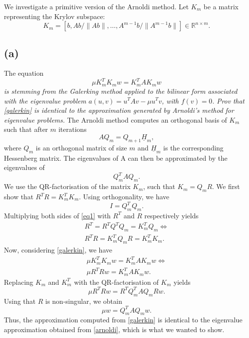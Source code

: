 We investigate a primitive version of the Arnoldi method. Let $K_m$ be a matrix representing the Krylov subspace: 
\begin{equation}
K_m = [b, Ab/ \|Ab\|,\dots,A^{m-1}b/ \|A^{m-1}b\|]
\in\mathbb{R}^{n\times m}.
\end{equation}
\subsection{(a)}
The equation
\begin{equation}\label{galerkin}
\mu K_m^TK_mw = K_m^TAK_mw
\end{equation}
\emph{is stemming from the Galerking method applied to the bilinear form associated with the eigenvalue problem $a(u,v) = u^TAv-\mu u^Tv$, with $f(v) = 0$. Prov that \eqref{galerkin} is identical to the approximation generated by Arnoldi's method for eigenvalue problems.}
The Arnoldi method computes an orthogonal basis of $K_m$ such that after $m$ iterations
\begin{equation}
AQ_m = Q_{m+1}\underline{H}_{{m}}, 
\end{equation}
where $Q_m$ is an orthogonal matrix of size $m$ and $\underline{H}_{m}$ is the corresponding Hessenberg matrix. The eigenvalues of A can then be approximated by the eigenvalues of 
\begin{equation}\label{arnoldi}
Q_m^TAQ_m.
\end{equation}
We use the QR-factorisation of the matrix $K_m$, such that $K_m = Q_mR$. We first show that $R^TR = K_m^TK_m$. Using orthogonality, we have
\begin{equation}\label{eq1}
I = Q^T_mQ_m.
\end{equation}
Multiplying both sides of \eqref{eq1} with $R^T$ and $R$ respectively yields
\begin{equation}
\begin{aligned}
R^T = R^TQ^TQ_m = K^T_mQ_m\Leftrightarrow\\
R^TR  = K^T_mQ_mR = K_m^TK_m.
\end{aligned}
\end{equation}
Now, considering \eqref{galerkin}, we have
\begin{equation}
\begin{aligned}
\mu K_m^TK_mw = K_m^TAK_mw\Leftrightarrow\\
\mu R^TRw = K_m^TAK_mw.
\end{aligned}
\end{equation}
Replacing $K_m$ and $K_m^T$ with the QR-factorisation of $K_m$ yields
\begin{equation}
\mu R^TRw = R^TQ_m^TAQ_mRw.
\end{equation}
Using that $R$ is non-singular, we obtain
\begin{equation}
\mu w = Q_m^TAQ_mw.
\end{equation}
Thus, the approximation computed from \eqref{galerkin} is identical to the eigenvalue approximation obtained from \eqref{arnoldi}, which is what we wanted to show.
